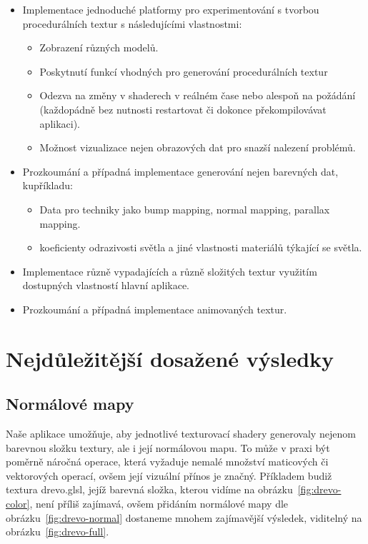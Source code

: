 \documentclass[12pt,a4paper,titlepage,final]{report}
\begin{document}
\begin{itemize}
	\item Implementace jednoduché platformy pro experimentování s tvorbou procedurálních textur s následujícími vlastnostmi:
	\begin{itemize}
		\item Zobrazení různých modelů.
		\item Poskytnutí funkcí vhodných pro generování procedurálních textur
		\item Odezva na změny v shaderech v reálném čase nebo alespoň na požádání (každopádně bez nutnosti restartovat či dokonce překompilovávat aplikaci).
		\item Možnost vizualizace nejen obrazových dat pro snazší nalezení problémů.
	\end{itemize}
	\item Prozkoumání a případná implementace generování nejen barevných dat, kupříkladu:
	\begin{itemize}
		\item Data pro techniky jako bump mapping, normal mapping, parallax mapping.
		\item koeficienty odrazivosti světla a jiné vlastnosti materiálů týkající se světla.
	\end{itemize}
	\item Implementace různě vypadajících a různě složitých textur využitím dostupných vlastností hlavní aplikace.
	\item Prozkoumání a případná implementace animovaných textur.
\end{itemize}

\chapter{Nejdůležitější dosažené výsledky}

\section{Normálové mapy}

Naše aplikace umožňuje, aby jednotlivé texturovací shadery generovaly nejenom barevnou složku textury, ale i její normálovou mapu. To může v praxi být poměrně náročná operace, která vyžaduje nemalé množství maticových či vektorových operací, ovšem její vizuální přínos je značný. Příkladem budiž textura drevo.glsl, jejíž barevná složka, kterou vidíme na obrázku~\ref{fig:drevo-color}, není příliš zajímavá, ovšem přidáním normálové mapy dle obrázku~\ref{fig:drevo-normal} dostaneme mnohem zajímavější výsledek, viditelný na obrázku~\ref{fig:drevo-full}.
\end{document}

